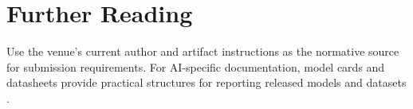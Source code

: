 
\section{Further Reading}

Use the venue's current author and artifact instructions as the normative
source for submission requirements.
For AI-specific documentation, model cards and datasheets provide practical
structures for reporting released models and datasets
\cite{mitchellModelCardsModel2019,gebruDatasheetsDatasets2021}.
